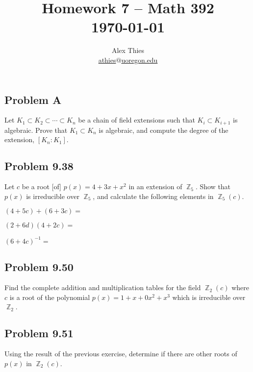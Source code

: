 \documentclass[letterpaper, 12pt]{amsart}
\DeclareMathOperator{\Z}{\mathbb{Z}}
\theoremstyle{definition}  %
\begin{document}
	\title{Homework 7  -- Math 392 \\ \today}
	\author{Alex Thies \\ \href{mailto:athies@uoregon.edu}{\lowercase{athies$@$uoregon.edu}}}

	\maketitle

	\subsection*{Problem A}
	\label{sub:problem_a}
	Let $K_{1} \subset K_{2} \subset \cdots \subset K_{n}$ be a chain of field extensions such that $K_{i} \subset K_{i+1}$ is algebraic.
	Prove that $K_{1} \subset K_{n}$ is algebraic, and compute the degree of the extension, $[K_{n} : K_{1}]$.


	\subsection*{Problem 9.38}
	\label{sub:problem_9_38}
	Let $c$ be a root [of] $p(x) = 4 + 3x + x^{2}$ in an extension of $\Z_{5}$.
	Show that $p(x)$ is irreducible over $\Z_{5}$, and calculate the following elements in $\Z_{5}(c)$. 
	
		$(4 + 5c) + (6 + 3c) = $
	
		$(2 + 6d)(4 + 2c) = $
	
		$(6 + 4c)^{-1} = $

	\subsection*{Problem 9.50}
	\label{sub:problem_9_50}
	Find the complete addition and multiplication tables for the field $\Z_{2}(c)$ where $c$ is a root of the polynomial $p(x) = 1 + x + 0x^{2} + x^{3}$ which is irreducible over $\Z_{2}$.

	\subsection*{Problem 9.51}
	\label{sub:problem_9_51}
	Using the result of the previous exercise, determine if there are other roots of $p(x)$ in $\Z_{2}(c)$.
\end{document}
